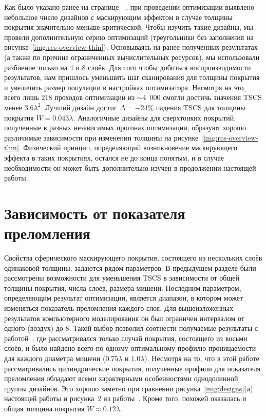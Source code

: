Как было указано ранее на
странице~\pageref{backref:thin-designs}~\label{ref:thin-designs}, при
проведении оптимизации выявлено небольшое число дизайнов с
маскирующим эффектом в случае толщины покрытия значительно меньше
критической.  Чтобы изучить такие дизайны, мы провели дополнительную
серию оптимизаций (треугольники без заполнения на
рисунке~\ref{img:rcs-overview-thin}).  Основываясь на ранее полученных
результатах (а также по причине ограниченных вычислительных ресурсов),
мы использовали разбиение только на 4 и 8 слоёв.  Для того чтобы
добиться воспроизводимости результатов, нам пришлось уменьшить шаг
сканирования для толщины покрытия и увеличить размер популяции в
настройках оптимизатора.  Несмотря на это, всего лишь 218 проходов
оптимизации из $\sim$4~000 смогли достичь значения TSCS менее
$3.6\lambda^2$.  Лучший дизайн достиг $\Delta = -24\%$ падения TSCS для толщины
покрытия $W=0.043\lambda$.  Аналогичные дизайны для сверхтонких
покрытий, полученные в разных независимых прогонах оптимизации,
образуют хорошо различимые зависимости при изменении толщины на
рисунке~\ref{img:rcs-overview-thin}.  Физический принцип, определяющий
возникновение маскирующего эффекта в таких покрытиях, остался не до
конца понятым, и в случае необходимости он может быть дополнительно
изучен в продолжении настоящей работы.


\section{Зависимость от показателя преломления}

Свойства сферического маскирующего покрытия, состоящего из нескольких
слоёв одинаковой толщины, задаются рядом параметров. В предыдущем
разделе были рассмотрены возможности для уменьшения TSCS в зависимости
от общей толщины покрытия, числа слоёв, размера мишени. Последним
параметром, определяющим результат оптимизации, является диапазон, в
котором может изменяться показатель преломления каждого слоя.  Для
вышеизложенных результатов компьютерного моделирования он был
ограничен интервалом от одного (воздух) до $8$.  Такой выбор позволил
соотнести получаемые результаты с работой~\cite{semouchkina2}, где
рассматривался только случай покрытия, состоящего из восьми
слоёв, и было найдено всего по одному оптимальному профилю
проницаемости для каждого диаметра мишени ($0.75\lambda$ и
$1.0\lambda$). Несмотря на то, что в этой работе рассматривались
цилиндрические покрытия, полученные профили для показателя преломления
обладают всеми характерными особенностями однодолинной группы
дизайнов. Это хорошо заметно при сравнении
рисунка~\ref{img:designs}(а) настоящей работы и рисунка~2 из
работы~\cite{semouchkina2}. Кроме того, похожей оказалась и общая
толщина покрытия $W\approx 0.12\lambda$.

